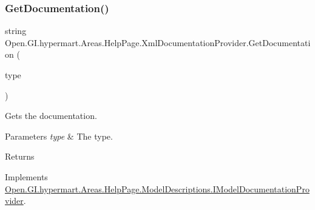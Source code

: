 \hypertarget{class_open_1_1_g_i_1_1hypermart_1_1_areas_1_1_help_page_1_1_xml_documentation_provider_af096939cdb4e5a26bd20ae3341fad66c}{}\label{class_open_1_1_g_i_1_1hypermart_1_1_areas_1_1_help_page_1_1_xml_documentation_provider_af096939cdb4e5a26bd20ae3341fad66c} 
\subsubsection{\texorpdfstring{Get\+Documentation()}{GetDocumentation()}\hspace{0.1cm}{\footnotesize\ttfamily [5/5]}}
{\footnotesize\ttfamily string Open.\+G\+I.\+hypermart.\+Areas.\+Help\+Page.\+Xml\+Documentation\+Provider.\+Get\+Documentation (\begin{DoxyParamCaption}\item[{Type}]{type }\end{DoxyParamCaption})}



Gets the documentation. 


\begin{DoxyParams}{Parameters}
{\em type} & The type.\\
\hline
\end{DoxyParams}
\begin{DoxyReturn}{Returns}

\end{DoxyReturn}


Implements \hyperlink{interface_open_1_1_g_i_1_1hypermart_1_1_areas_1_1_help_page_1_1_model_descriptions_1_1_i_model_documentation_provider_a047061b90c62930fc0a1dbcb09732bd3}{Open.\+G\+I.\+hypermart.\+Areas.\+Help\+Page.\+Model\+Descriptions.\+I\+Model\+Documentation\+Provider}.

\hypertarget{class_open_1_1_g_i_1_1hypermart_1_1_areas_1_1_help_page_1_1_xml_documentation_provider_a3f8e45cb0b20d0aef5e795a7ac638346}{}\label{class_open_1_1_g_i_1_1hypermart_1_1_areas_1_1_help_page_1_1_xml_documentation_provider_a3f8e45cb0b20d0aef5e795a7ac638346} 
